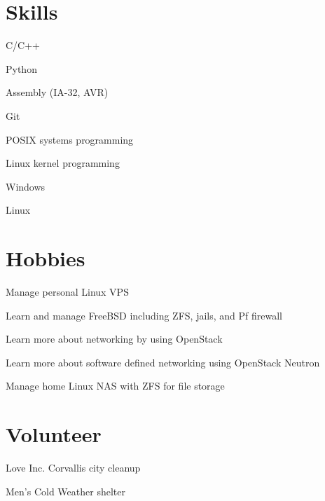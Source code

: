 \documentclass[margin,line]{resume}
\begin{document}
\begin{resume}
    \section{\mysidestyle Skills}
    \begin{list2}
    \item C/C++
    \item Python
    \item Assembly (IA-32, AVR)
    \item Git
    \item POSIX systems programming
    \item Linux kernel programming
    \item Windows
    \item Linux\\
    \end{list2}\vspace{-1.5mm}

    \section{\mysidestyle Hobbies}
    \begin{list2}
    \item Manage personal Linux VPS
    \item Learn and manage FreeBSD including ZFS, jails, and Pf firewall
    \item Learn more about networking by using OpenStack
    \item Learn more about software defined networking using OpenStack Neutron
    \item Manage home Linux NAS with ZFS for file storage\\
    \end{list2}\vspace{-1.5mm}


    \section{\mysidestyle Volunteer}
    \begin{list2}
    \item Love Inc. Corvallis city cleanup
    \item Men's Cold Weather shelter
    \end{list2}\vspace{-1.5mm}


\end{resume}
\end{document}
